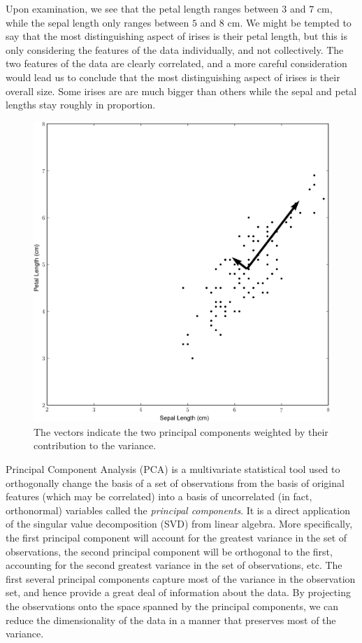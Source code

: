 Upon examination, we see that the petal length ranges between $3$ and $7$ cm, while the sepal length only ranges between $5$ and $8$ cm. We might be tempted to say that the most distinguishing aspect of irises is their petal length, but this is only considering the features of the data individually, and not collectively. The two features of the data are clearly correlated, and a more careful consideration would lead us to conclude that the most distinguishing aspect of irises is their overall size. Some irises are are much bigger than others while the sepal and petal lengths stay roughly in proportion.
\begin{figure}
\includegraphics[width=\textwidth]{iris2.pdf}
\caption{The vectors indicate the two principal components weighted by their contribution to the variance.}
\label{fig:iris_2}
\end{figure}

Principal Component Analysis (PCA) is a multivariate statistical tool used to orthogonally change the basis of a set of observations from the basis of original features (which may be correlated) into a basis of uncorrelated (in fact, orthonormal) variables called the \emph{principal components}. It is a direct application of the singular value decomposition (SVD) from linear algebra. More specifically, the first principal component will account for the greatest variance in the set of observations, the second principal component will be orthogonal to the first, accounting for the second greatest variance in the set of observations, etc. The first several principal components capture most of the variance in the observation set, and hence provide a great deal of information about the data. By projecting the observations onto the space spanned by the principal components, we can reduce the dimensionality of the data in a manner that preserves most of the variance.

